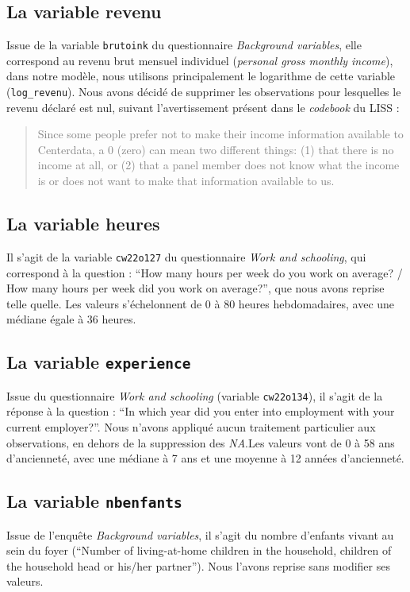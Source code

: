 \documentclass[a4paper, french, 11 pt]{article}\usepackage[]{graphicx}\usepackage[]{xcolor}
\begin{document}
\subsection{La variable revenu}

Issue de la variable \texttt{brutoink} du questionnaire \textit{Background variables}, elle correspond au revenu brut mensuel individuel (\textit{personal gross monthly income}), dans notre modèle, nous utilisons principalement le logarithme de cette variable (\verb+log_revenu+). Nous avons décidé de supprimer les observations pour lesquelles le revenu déclaré est nul, suivant l'avertissement présent dans le \textit{codebook} du LISS : 

\begin{quote}
\textcolor{gray}{Since some people prefer not to make their income information available to Centerdata, a 0 (zero) can mean two different things: (1) that there is no income at all, or (2) that a panel member does not know what the income is or does not want to make that information available to us.}
\end{quote}

\subsection{La variable heures}

Il s'agit de la variable \texttt{cw22o127} du questionnaire \textit{Work and schooling}, qui correspond à la question : \enquote{How many hours per week do you work on average? / How many hours per week did you work on average?}, que nous avons reprise telle quelle. Les valeurs s'échelonnent de 0 à 80 heures hebdomadaires, avec une médiane égale à 36 heures.

\subsection{La variable \texttt{experience}}

Issue du questionnaire \textit{Work and schooling} (variable \texttt{cw22o134}), il s'agit de la réponse à la question : \enquote{In which year did you enter into employment with your current employer?}. Nous n'avons appliqué aucun traitement particulier aux observations, en dehors de la suppression des \textit{NA}.Les valeurs vont de 0 à 58 ans d'ancienneté, avec une médiane à 7 ans et une moyenne à 12 années d'ancienneté. 

\subsection{La variable \texttt{nbenfants}}

Issue de l'enquête \textit{Background variables}, il s'agit du nombre d'enfants vivant au sein du foyer (\enquote{Number of living-at-home children in the household, children of the household head or his/her partner}). Nous l'avons reprise sans modifier ses valeurs. 
\end{document}
